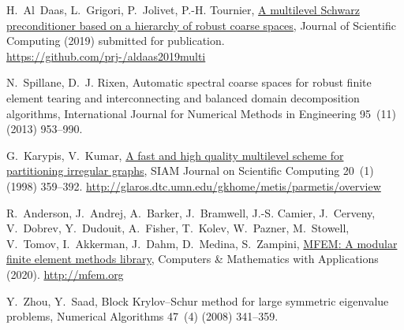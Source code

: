 \documentclass[3p,11pt]{elsarticle}
\begin{document}
\begin{thebibliography}{10}
H.~Al~Daas, L.~Grigori, P.~Jolivet, P.-H. Tournier,
  \href{https://github.com/prj-/aldaas2019multi}{A multilevel {S}chwarz
  preconditioner based on a hierarchy of robust coarse spaces}, Journal of
  Scientific Computing (2019) submitted for publication.
\newline\urlprefix\url{https://github.com/prj-/aldaas2019multi}

N.~Spillane, D.~J. Rixen, Automatic spectral coarse spaces for robust finite
  element tearing and interconnecting and balanced domain decomposition
  algorithms, International Journal for Numerical Methods in Engineering
  95~(11) (2013) 953--990.

G.~Karypis, V.~Kumar,
  \href{http://glaros.dtc.umn.edu/gkhome/metis/parmetis/overview}{A fast and
  high quality multilevel scheme for partitioning irregular graphs}, SIAM
  Journal on Scientific Computing 20~(1) (1998) 359--392.
\newline\urlprefix\url{http://glaros.dtc.umn.edu/gkhome/metis/parmetis/overview}

R.~Anderson, J.~Andrej, A.~Barker, J.~Bramwell, J.-S. Camier, J.~Cerveny,
  V.~Dobrev, Y.~Dudouit, A.~Fisher, T.~Kolev, W.~Pazner, M.~Stowell, V.~Tomov,
  I.~Akkerman, J.~Dahm, D.~Medina, S.~Zampini, \href{http://mfem.org}{{MFEM}: A
  modular finite element methods library}, Computers \& Mathematics with
  Applications (2020).
\newline\urlprefix\url{http://mfem.org}

Y.~Zhou, Y.~Saad, Block {K}rylov--{S}chur method for large symmetric eigenvalue
  problems, Numerical Algorithms 47~(4) (2008) 341--359.

\end{thebibliography}
\end{document}
